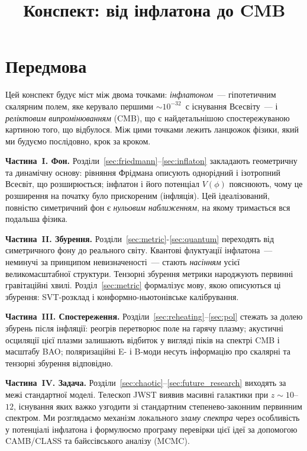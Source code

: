 \documentclass[12pt, a4paper]{article}
\title{\bfseries Конспект: від інфлатона до CMB}
\author{}
\date{}
\begin{document}
\maketitle
\tableofcontents
\newpage



\section*{Передмова}


Цей конспект будує міст між двома точками: \emph{інфлатоном}~---
гіпотетичним скалярним полем, яке керувало першими
${\sim}10^{-32}$~с існування Всесвіту~--- і \emph{реліктовим випромінюванням} (CMB),
що є найдетальнішою спостережуваною картиною того, що відбулося.
Між цими точками лежить ланцюжок фізики, який ми будуємо
послідовно, крок за кроком.

\textbf{Частина~I. Фон.} Розділи~\ref{sec:friedmann}–\ref{sec:inflaton}
закладають геометричну та динамічну основу: рівняння Фрідмана описують
однорідний і ізотропний Всесвіт, що розширюється; інфлатон і його
потенціал $V(\phi)$ пояснюють, чому це розширення на початку було
прискореним (інфляція). Цей ідеалізований, повністю симетричний фон є
\emph{нульовим наближенням}, на якому тримається вся подальша фізика.

\textbf{Частина~II. Збурення.} Розділи~\ref{sec:metric}-\ref{sec:quantum}
переходять від симетричного фону до реального світу. Квантові флуктуації
інфлатона~--- неминучі за принципом невизначеності~--- стають
\emph{насінням} усієї великомасштабної структури. Тензорні збурення
метрики народжують первинні гравітаційні хвилі. Розділ~\ref{sec:metric}
формалізує мову, якою описуються ці збурення: SVT-розклад і
конформно-ньютонівське калібрування.

\textbf{Частина~III. Спостереження.} Розділи~\ref{sec:reheating}–\ref{sec:pol}
стежать за долею збурень після інфляції: реогрів перетворює поле на
гарячу плазму; акустичні осциляції цієї плазми залишають відбиток у
вигляді піків на спектрі CMB і масштабу BAO; поляризаційні E- і B-моди
несуть інформацію про скалярні та тензорні збурення відповідно.

\textbf{Частина~IV. Задача.} Розділи~\ref{sec:chaotic}–\ref{sec:future_research}
виходять за межі стандартної моделі. Телескоп JWST виявив масивні
галактики при $z \sim 10$–$12$, існування яких важко узгодити зі
стандартним степенево-законним первинним спектром. Ми розглядаємо
механізм локального \emph{зламу спектра} через особливість у потенціалі
інфлатона і формулюємо програму перевірки цієї ідеї за допомогою
CAMB/CLASS та байєсівського аналізу (MCMC).
\end{document}
